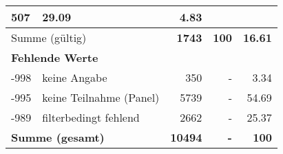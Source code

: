 \begin{longtable}{lXrrr}
       \num{507} &
       \num[round-mode=places,round-precision=2]{29,09} &
         \num[round-mode=places,round-precision=2]{4,83} \\
     \midrule
     \multicolumn{2}{l}{Summe (gültig)} &
       \textbf{\num{1743}} &
     \textbf{100} &
       \textbf{\num[round-mode=places,round-precision=2]{16,61}} \\
     \multicolumn{5}{l}{\textbf{Fehlende Werte}}\\
       -998 &
       keine Angabe &
         \num{350} &
        - &
         \num[round-mode=places,round-precision=2]{3,34} \\
       -995 &
       keine Teilnahme (Panel) &
         \num{5739} &
        - &
         \num[round-mode=places,round-precision=2]{54,69} \\
       -989 &
       filterbedingt fehlend &
         \num{2662} &
        - &
         \num[round-mode=places,round-precision=2]{25,37} \\
     \midrule
     \multicolumn{2}{l}{\textbf{Summe (gesamt)}} &
          \textbf{\num{10494}} &
        \textbf{-} &
        \textbf{100} \\
     \bottomrule
     \end{longtable}
     
